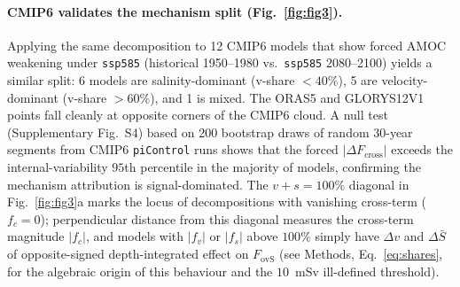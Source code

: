 \documentclass[12pt,a4paper]{article}
\newcommand{\Fovs}{F_\mathrm{ovS}}
\newcommand{\dFc}{\Delta F_\mathrm{cross}}
\begin{document}
\paragraph{CMIP6 validates the mechanism split (Fig.~\ref{fig:fig3}).}
Applying the same decomposition to 12 CMIP6 models that show forced
AMOC weakening under \texttt{ssp585} (historical 1950--1980 vs.\
\texttt{ssp585} 2080--2100) yields a similar split: 6 models are
salinity-dominant (v-share ${< 40\%}$), 5 are velocity-dominant
(v-share ${> 60\%}$), and 1 is mixed. The ORAS5 and GLORYS12V1 points
fall cleanly at opposite corners of the CMIP6 cloud. A null test
(Supplementary Fig.~S4) based on 200 bootstrap draws of random 30-year
segments from CMIP6 \texttt{piControl} runs shows that the forced
$|\dFc|$ exceeds the internal-variability $95$th percentile in the
majority of models, confirming the mechanism attribution is
signal-dominated. The $v+s=100\%$ diagonal in Fig.~\ref{fig:fig3}a
marks the locus of decompositions with vanishing cross-term
($f_c = 0$); perpendicular distance from this diagonal measures the
cross-term magnitude $|f_c|$, and models with
$|f_v|$ or $|f_s|$ above $100\%$ simply have $\Delta v$ and
$\Delta\bar{S}$ of opposite-signed depth-integrated effect on
$\Fovs$ (see Methods, Eq.~\eqref{eq:shares}, for the algebraic
origin of this behaviour and the $10$~mSv ill-defined threshold).
\end{document}
